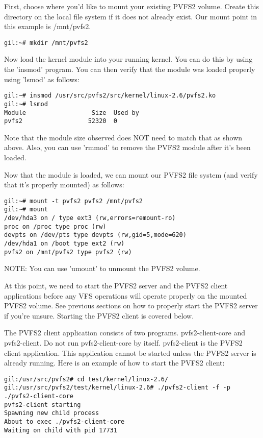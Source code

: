 \documentclass[11pt, letterpaper]{article}
\begin{document}
First, choose where you'd like to mount your existing PVFS2 volume.
Create this directory on the local file system if it does not already
exist.  Our mount point in this example is /mnt/pvfs2.

\begin{verbatim}
gil:~# mkdir /mnt/pvfs2
\end{verbatim}

Now load the kernel module into your running kernel.  You can do this
by using the 'insmod' program.  You can then verify that the module
was loaded properly using 'lsmod' as follows:

\begin{verbatim}
gil:~# insmod /usr/src/pvfs2/src/kernel/linux-2.6/pvfs2.ko
gil:~# lsmod
Module                  Size  Used by
pvfs2                  52320  0 
\end{verbatim}

Note that the module size observed does NOT need to match that as
shown above.  Also, you can use 'rmmod' to remove the PVFS2 module
after it's been loaded.

Now that the module is loaded, we can mount our PVFS2 file system (and
verify that it's properly mounted) as follows:

\begin{verbatim}
gil:~# mount -t pvfs2 pvfs2 /mnt/pvfs2
gil:~# mount
/dev/hda3 on / type ext3 (rw,errors=remount-ro)
proc on /proc type proc (rw)
devpts on /dev/pts type devpts (rw,gid=5,mode=620)
/dev/hda1 on /boot type ext2 (rw)
pvfs2 on /mnt/pvfs2 type pvfs2 (rw)
\end{verbatim}

NOTE:  You can use 'umount' to unmount the PVFS2 volume.

At this point, we need to start the PVFS2 server and the PVFS2 client
applications before any VFS operations will operate properly on the
mounted PVFS2 volume.  See previous sections on how to properly start
the PVFS2 server if you're unsure.  Starting the PVFS2 client is
covered below.

The PVFS2 client application consists of two programs.
pvfs2-client-core and pvfs2-client.  Do not run pvfs2-client-core by
itself.  pvfs2-client is the PVFS2 client application.  This
application cannot be started unless the PVFS2 server is already
running.  Here is an example of how to start the PVFS2 client:

\begin{verbatim}
gil:/usr/src/pvfs2# cd test/kernel/linux-2.6/
gil:/usr/src/pvfs2/test/kernel/linux-2.6# ./pvfs2-client -f -p ./pvfs2-client-core
pvfs2-client starting
Spawning new child process
About to exec ./pvfs2-client-core
Waiting on child with pid 17731
\end{verbatim}
\end{document}
